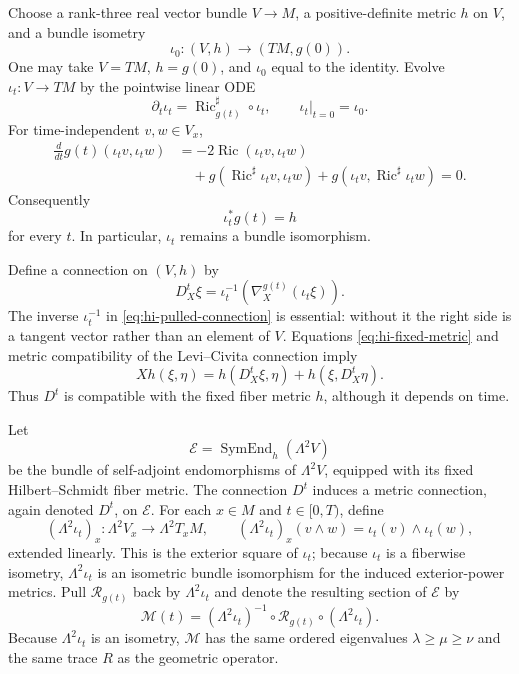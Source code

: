 \documentclass[10pt]{coll-l}
\theoremstyle{definition}
\theoremstyle{remark}
\numberwithin{section}{chapter}
\numberwithin{equation}{chapter}
\newcommand{\Ric}{\operatorname{Ric}}
\begin{document}
Choose a rank-three real vector bundle $V\to M$, a positive-definite metric
$h$ on $V$, and a bundle isometry
\[
       \iota_0:(V,h)\longrightarrow(TM,g(0)).
\]
One may take $V=TM$, $h=g(0)$, and $\iota_0$ equal to the identity.  Evolve
$\iota_t:V\to TM$ by the pointwise linear ODE
\begin{equation}
 \partial_t\iota_t=\Ric_{g(t)}^\sharp\circ\iota_t,
 \qquad \iota_t|_{t=0}=\iota_0.                           \label{eq:hi-uhlenbeck-ode}
\end{equation}
For time-independent $v,w\in V_x$,
\begin{align*}
 \frac{d}{dt}g(t)(\iota_tv,\iota_tw)
 &= -2\Ric(\iota_tv,\iota_tw)\\
 &\quad
   +g(\Ric^\sharp\iota_tv,\iota_tw)
   +g(\iota_tv,\Ric^\sharp\iota_tw)=0.
\end{align*}
Consequently
\begin{equation}
                  \iota_t^*g(t)=h                         \label{eq:hi-fixed-metric}
\end{equation}
for every $t$.  In particular, $\iota_t$ remains a bundle isomorphism.

Define a connection on $(V,h)$ by
\begin{equation}
 D_X^t\xi
   =\iota_t^{-1}\!\left(
       \nabla_X^{g(t)}(\iota_t\xi)\right).                \label{eq:hi-pulled-connection}
\end{equation}
The inverse $\iota_t^{-1}$ in \eqref{eq:hi-pulled-connection} is essential:
without it the right side is a tangent vector rather than an element of
$V$.  Equations \eqref{eq:hi-fixed-metric} and metric compatibility of the
Levi--Civita connection imply
\[
 Xh(\xi,\eta)=h(D_X^t\xi,\eta)+h(\xi,D_X^t\eta).
\]
Thus $D^t$ is compatible with the fixed fiber metric $h$, although it
depends on time.

Let
\[
 \mathcal E=\operatorname{SymEnd}_h(\Lambda^2V)
\]
be the bundle of self-adjoint endomorphisms of $\Lambda^2V$, equipped with
its fixed Hilbert--Schmidt fiber metric.  The connection $D^t$ induces a
metric connection, again denoted $D^t$, on $\mathcal E$.  For each $x\in M$
and $t\in[0,T)$, define
\[
 (\Lambda^2\iota_t)_x:\Lambda^2V_x\longrightarrow\Lambda^2T_xM,
 \qquad
 (\Lambda^2\iota_t)_x(v\wedge w)=\iota_t(v)\wedge\iota_t(w),
\]
extended linearly.  This is the exterior square of $\iota_t$; because
$\iota_t$ is a fiberwise isometry, $\Lambda^2\iota_t$ is an isometric
bundle isomorphism for the induced exterior-power metrics.  Pull
$\mathcal R_{g(t)}$ back by $\Lambda^2\iota_t$ and denote the resulting
section of $\mathcal E$ by
\begin{equation}
 \mathcal M(t)
   =(\Lambda^2\iota_t)^{-1}\circ
      \mathcal R_{g(t)}\circ(\Lambda^2\iota_t).            \label{eq:hi-pulled-curvature}
\end{equation}
Because $\Lambda^2\iota_t$ is an isometry, $\mathcal M$ has the same ordered
eigenvalues $\lambda\geq\mu\geq\nu$ and the same trace $R$ as the geometric
operator.
\end{document}
